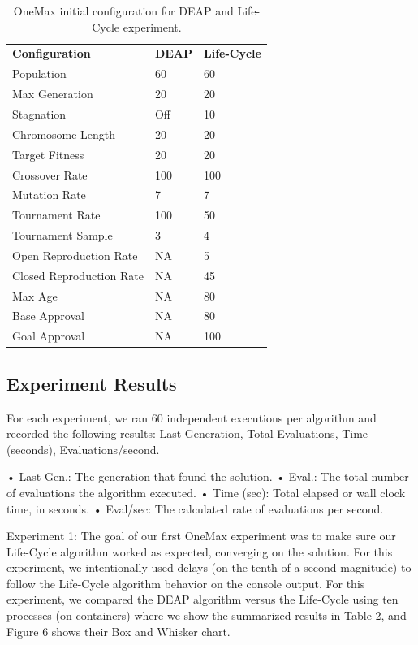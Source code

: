 \documentclass[runningheads]{llncs}
\begin{document}
\begin{table}[]
    \centering        
    \caption{OneMax initial configuration for DEAP and Life-Cycle experiment.}\label{tab1}
    \begin{tabular}{lll}
    \textbf{Configuration} & \textbf{DEAP} & \textbf{Life-Cycle} \\
    Population & 60 & 60 \\
    Max Generation & 20 & 20 \\
    Stagnation & Off & 10 \\
    Chromosome Length & 20 & 20 \\
    Target Fitness & 20 & 20 \\
    Crossover Rate & 100 & 100 \\
    Mutation Rate & 7 & 7 \\
    Tournament Rate & 100 & 50 \\
    Tournament Sample & 3 & 4 \\
    Open Reproduction Rate & NA & 5 \\
    Closed Reproduction Rate & NA & 45 \\
    Max Age & NA & 80 \\
    Base Approval & NA & 80 \\
    Goal Approval & NA & 100
    \end{tabular}
    \end{table}


\subsection{Experiment Results}

For each experiment, we ran 60 independent executions per algorithm and
recorded the following results: Last Generation, Total Evaluations, Time
(seconds), Evaluations/second.

•	Last Gen.: The generation that found the solution.
•	Eval.: The total number of evaluations the algorithm executed. 
•	Time (sec): Total elapsed or wall clock time, in seconds. 
•	Eval/sec: The calculated rate of evaluations per second.

Experiment 1: The goal of our first OneMax experiment was to make sure our
Life-Cycle algorithm worked as expected, converging on the solution. For this
experiment, we intentionally used delays (on the tenth of a second magnitude)
to follow the Life-Cycle algorithm behavior on the console output. For this
experiment, we compared the DEAP algorithm versus the Life-Cycle using ten
processes (on containers) where we show the summarized results in Table 2, and
Figure 6 shows their Box and Whisker chart.
\end{document}
